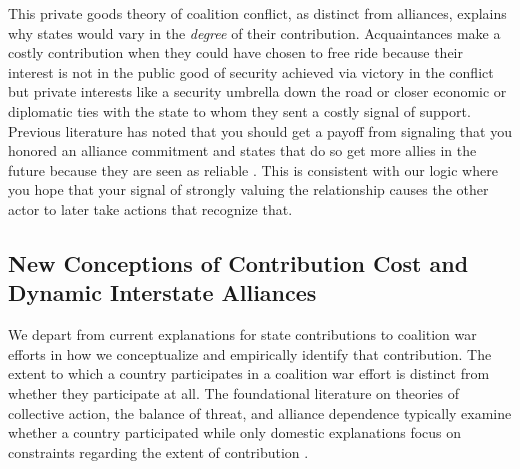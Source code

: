 \documentclass[12pt,letterpaper]{article}
\begin{document}
	This private goods theory of coalition conflict, as distinct from alliances, explains why states would vary in the \textit{degree} of their contribution. Acquaintances make a costly contribution when they could have chosen to free ride because their interest is not in the public good of security achieved via victory in the conflict but private interests like a security umbrella down the road or closer economic or diplomatic ties with the state to whom they sent a costly signal of support. Previous literature has noted that you should get a payoff from signaling that you honored an alliance commitment and states that do so get more allies in the future because they are seen as reliable \citep[427-428]{gibler_costsrenegingreputation_2008}. This is consistent with our logic where you hope that your signal of strongly valuing the relationship causes the other actor to later take actions that recognize that.
	
	\subsection{New Conceptions of Contribution Cost and Dynamic Interstate Alliances}
		We depart from current explanations for state contributions to coalition war efforts in how we conceptualize and empirically identify that contribution. The extent to which a country participates in a coalition war effort is distinct from whether they participate at all. The foundational literature on theories of collective action, the balance of threat, and alliance dependence typically examine whether a country participated while only domestic explanations focus on constraints regarding the extent of contribution \citep{bennett_burdensharingpersiangulf_1994, bogers_missionafghanistanwho_2013}.
\end{document}
